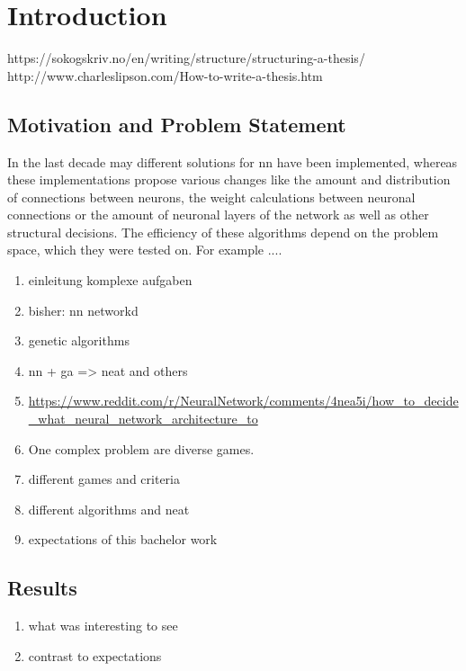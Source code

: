 %
\chapter{Introduction}
\label{sec:intro}



https://sokogskriv.no/en/writing/structure/structuring-a-thesis/
http://www.charleslipson.com/How-to-write-a-thesis.htm

\section{Motivation and Problem Statement}
\label{sec:intro:motivation}
In the last decade may different solutions for \gls{nn} have been implemented, whereas these implementations propose various changes like the amount and distribution of connections between neurons, the weight calculations between neuronal connections or the amount of neuronal layers  of the network as well as other structural decisions. 
The efficiency of these algorithms depend on the problem space, which they were tested on. For example ....
\begin{enumerate}
	\item einleitung komplexe aufgaben
	\item bisher: nn networkd
	\item genetic algorithms
	\item nn + ga => neat and others
	\item \url{https://www.reddit.com/r/NeuralNetwork/comments/4nea5i/how_to_decide_what_neural_network_architecture_to}
	\item One complex problem are diverse games. 
	\item different games and criteria
	\item different algorithms and neat
	\item expectations of this bachelor work
\end{enumerate}


\section{Results}
\label{sec:intro:results}
\begin{enumerate}
	\item what was interesting to see
	\item contrast to expectations
\end{enumerate}


